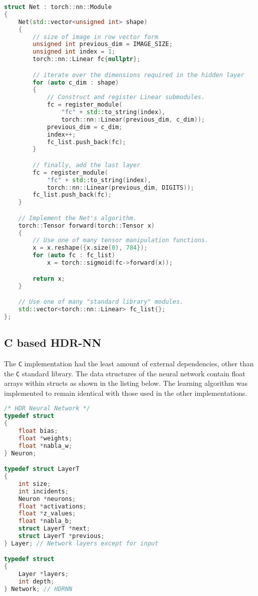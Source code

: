 \begin{lstlisting}[language=C++]
struct Net : torch::nn::Module
{
	Net(std::vector<unsigned int> shape)
	{
		// size of image in row vector form
		unsigned int previous_dim = IMAGE_SIZE;
		unsigned int index = 1;
		torch::nn::Linear fc{nullptr};

		// iterate over the dimensions required in the hidden layer
		for (auto c_dim : shape)
		{
			// Construct and register Linear submodules.
			fc = register_module(
				"fc" + std::to_string(index),
				torch::nn::Linear(previous_dim, c_dim));
			previous_dim = c_dim;
			index++;
			fc_list.push_back(fc);
		}

		// finally, add the last layer
		fc = register_module(
			"fc" + std::to_string(index),
			torch::nn::Linear(previous_dim, DIGITS));
		fc_list.push_back(fc);
	}

	// Implement the Net's algorithm.
	torch::Tensor forward(torch::Tensor x)
	{
		// Use one of many tensor manipulation functions.
		x = x.reshape({x.size(0), 784});
		for (auto fc : fc_list)
			x = torch::sigmoid(fc->forward(x));

		return x;
	}

	// Use one of many "standard library" modules.
	std::vector<torch::nn::Linear> fc_list{};
};
\end{lstlisting}


\subsection{C based HDR-NN}

The \texttt{C} implementation had the least amount of external dependencies, other than the \texttt{C} standard library. The data structures of the neural network contain float arrays within structs as shown in the listing below. The learning algorithm was implemented to remain identical with those used in the other implementations.

\begin{lstlisting}[language=C]
/* HDR Neural Network */
typedef struct
{
	float bias;
	float *weights;
	float *nabla_w;
} Neuron;

typedef struct LayerT
{
	int size;
	int incidents;
	Neuron *neurons;
	float *activations;
	float *z_values;
	float *nabla_b;
	struct LayerT *next;
	struct LayerT *previous;
} Layer; // Network layers except for input

typedef struct
{
	Layer *layers;
	int depth;
} Network; // HDRNN
\end{lstlisting}


